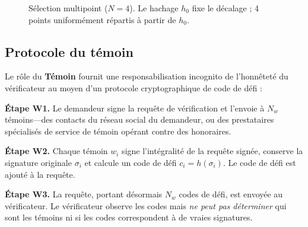 \documentclass[11pt,a4paper,twocolumn]{article}
\begin{document}
\begin{figure}[ht]
\centering
{}
\caption{Sélection multipoint ($N{=}4$). Le hachage $h_0$ fixe le décalage ; 4 points uniformément répartis à partir de $h_0$.}
\label{fig:multipoint}
\end{figure}

\subsection{Protocole du témoin}

Le rôle du \textbf{Témoin} fournit une responsabilisation incognito de l'honnêteté du vérificateur au moyen d'un protocole cryptographique de code de défi :

\textbf{Étape W1.} Le demandeur signe la requête de vérification et l'envoie à $N_w$ témoins---des contacts du réseau social du demandeur, ou des prestataires spécialisés de service de témoin opérant contre des honoraires.

\textbf{Étape W2.} Chaque témoin $w_i$ signe l'intégralité de la requête signée, conserve la signature originale $\sigma_i$ et calcule un code de défi $c_i = h(\sigma_i)$. Le code de défi est ajouté à la requête.

\textbf{Étape W3.} La requête, portant désormais $N_w$ codes de défi, est envoyée au vérificateur. Le vérificateur observe les codes mais \emph{ne peut pas déterminer} qui sont les témoins ni si les codes correspondent à de vraies signatures.
\end{document}
